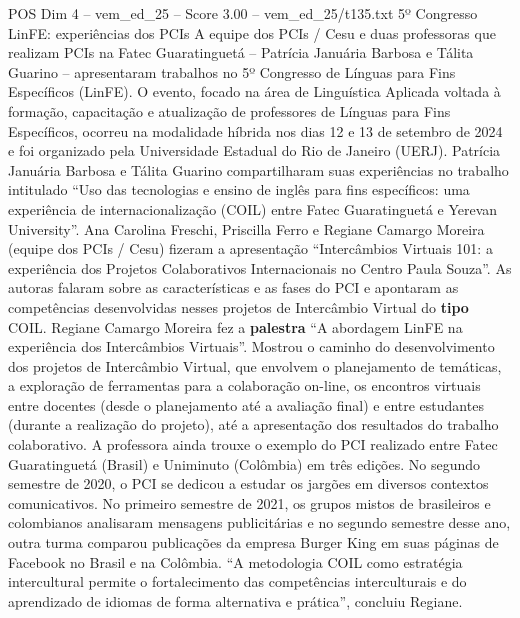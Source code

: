 \begin{textsample}{POS Dim 4 – vem\_ed\_25 – Score 3.00 – vem\_ed\_25/t135.txt}  \label{ex:f4_pos_055}
5º Congresso LinFE: experiências dos PCIs A equipe dos PCIs / Cesu e duas professoras que realizam PCIs na Fatec Guaratinguetá – Patrícia Januária Barbosa e Tálita Guarino – apresentaram trabalhos no 5º Congresso de Línguas para Fins Específicos (LinFE).
O evento, focado na área de Linguística Aplicada voltada à formação, capacitação e atualização de professores de Línguas para Fins Específicos, ocorreu na modalidade híbrida nos dias 12 e 13 de setembro de 2024 e foi organizado pela Universidade Estadual do Rio de Janeiro (UERJ).
Patrícia Januária Barbosa e Tálita Guarino compartilharam suas experiências no trabalho intitulado “Uso das tecnologias e ensino de inglês para fins específicos: uma experiência de internacionalização (COIL) entre Fatec Guaratinguetá e Yerevan University”.
Ana Carolina Freschi, Priscilla Ferro e Regiane Camargo Moreira (equipe dos PCIs / Cesu) fizeram a apresentação “Intercâmbios Virtuais 101: a experiência dos Projetos Colaborativos Internacionais no Centro Paula Souza”.
As autoras falaram sobre as características e as fases do PCI e apontaram as competências desenvolvidas nesses projetos de Intercâmbio Virtual do \textbf{tipo} COIL.
Regiane Camargo Moreira fez a \textbf{palestra} “A abordagem LinFE na experiência dos Intercâmbios Virtuais”.
Mostrou o caminho do desenvolvimento dos projetos de Intercâmbio Virtual, que envolvem o planejamento de temáticas, a exploração de ferramentas para a colaboração on-line, os encontros virtuais entre docentes (desde o planejamento até a avaliação final) e entre estudantes (durante a realização do projeto), até a apresentação dos resultados do trabalho colaborativo.
A professora ainda trouxe o exemplo do PCI realizado entre Fatec Guaratinguetá (Brasil) e Uniminuto (Colômbia) em três edições.
No segundo semestre de 2020, o PCI se dedicou a estudar os jargões em diversos contextos comunicativos.
No primeiro semestre de 2021, os grupos mistos de brasileiros e colombianos analisaram mensagens publicitárias e no segundo semestre desse ano, outra turma comparou publicações da empresa Burger King em suas páginas de Facebook no Brasil e na Colômbia. “A metodologia COIL como estratégia intercultural permite o fortalecimento das competências interculturais e do aprendizado de idiomas de forma alternativa e prática”, concluiu Regiane.

\end{textsample}
